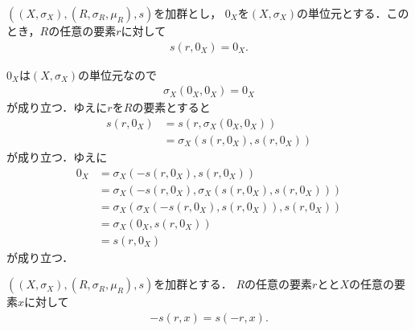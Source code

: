 	\begin{screen}
		\begin{thm}[ゼロには何を掛けてもゼロ]\label{thm:zero_multiplied_is_zero}
			$\left((X,\sigma_X),(R,\sigma_R,\mu_R),s\right)$を加群とし，
			$0_X$を$(X,\sigma_X)$の単位元とする．このとき，$R$の任意の要素$r$に対して
			\begin{align}
				s\left(r,0_X\right) = 0_X.
			\end{align}
		\end{thm}
	\end{screen}
	
	\begin{sketch}
		$0_X$は$(X,\sigma_X)$の単位元なので
		\begin{align}
			\sigma_X\left(0_X,0_X\right) = 0_X
		\end{align}
		が成り立つ．ゆえに$r$を$R$の要素とすると
		\begin{align}
			s\left(r,0_X\right) &= s\left(r,\sigma_X\left(0_X,0_X\right)\right) \\
			&= \sigma_X\left(s\left(r,0_X\right),s\left(r,0_X\right)\right)
		\end{align}
		が成り立つ．ゆえに
		\begin{align}
			0_X &= \sigma_X\left(-s\left(r,0_X\right),s\left(r,0_X\right)\right) \\
			&= \sigma_X\left(-s\left(r,0_X\right),\sigma_X\left(s\left(r,0_X\right),s\left(r,0_X\right)\right)\right) \\
			&= \sigma_X\left(\sigma_X\left(-s\left(r,0_X\right),s\left(r,0_X\right)\right),s\left(r,0_X\right)\right) \\
			&= \sigma_X\left(0_X,s\left(r,0_X\right)\right) \\
			&= s\left(r,0_X\right)
		\end{align}
		が成り立つ．
		\QED
	\end{sketch}
	
	\begin{screen}
		\begin{thm}\label{thm:inverse_element_equals_to_its_minus}
			$\left((X,\sigma_X),(R,\sigma_R,\mu_R),s\right)$を加群とする．
			$R$の任意の要素$r$と$とX$の任意の要素$x$に対して
			\begin{align}
				-s(r,x) = s\left(-r,x\right).
			\end{align}
		\end{thm}
	\end{screen}
	

